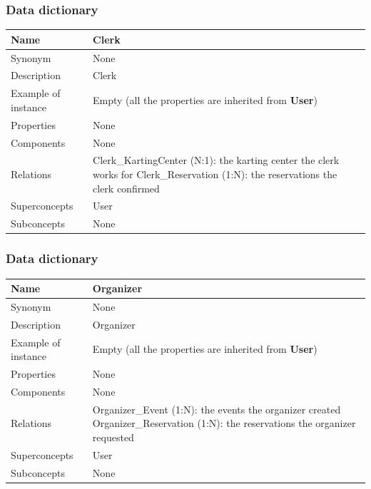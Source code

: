 \documentclass{beamer}
\begin{document}
\begin{frame}
    \frametitle{Data dictionary}
    \begin{table}
    \tiny
    \begin{tabular}{|p{2cm}|p{6cm}|}
    \hline
    Name & \textbf{Clerk} \\
    \hline
    Synonym & None \\
    \hline
    Description & Clerk \\
    \hline
    Example of instance & Empty (all the properties are inherited from \textbf{User}) \\
    \hline
    Properties & None \\
    \hline
    Components & None \\
    \hline
    Relations &
    Clerk\_KartingCenter (N:1): the karting center the clerk works for \newline
    Clerk\_Reservation (1:N): the reservations the clerk confirmed \\
    \hline
    Superconcepts & User \\
    \hline
    Subconcepts & None \\
    \hline
    \end{tabular}
    \end{table}
\end{frame}

\begin{frame}
    \frametitle{Data dictionary}
    \begin{table}
    \tiny
    \begin{tabular}{|p{2cm}|p{6cm}|}
    \hline
    Name & \textbf{Organizer} \\
    \hline
    Synonym & None \\
    \hline
    Description & Organizer \\
    \hline
    Example of instance & Empty (all the properties are inherited from \textbf{User}) \\
    \hline
    Properties & None \\
    \hline
    Components & None \\
    \hline
    Relations &
    Organizer\_Event (1:N): the events the organizer created \newline
    Organizer\_Reservation (1:N): the reservations the organizer requested \\
    \hline
    Superconcepts & User \\
    \hline
    Subconcepts & None \\
    \hline
    \end{tabular}
    \end{table}
\end{frame}
\end{document}
